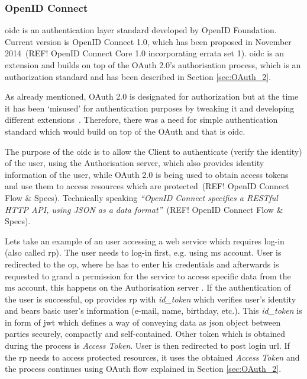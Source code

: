 \subsubsection{OpenID Connect}

\acrfull{oidc} is an authentication layer standard developed by OpenID Foundation. Current version is OpenID Connect 1.0, which has been proposed in November 2014~\cite{}(REF! OpenID Connect Core 1.0 incorporating errata set 1). \acrshort{oidc} is an extension and builds on top of the OAuth 2.0’s authorisation process, which is an authorization standard and has been described in Section \ref{sec:OAuth_2}. 

As already mentioned, OAuth 2.0 is designated for authorization but at the time it has been ‘misused’ for authentication purposes by tweaking it and developing different extensions~\cite{User Authentication with OAuth 2.0}. Therefore, there was a need for simple authentication standard which would build on top of the OAuth and that is \acrshort{oidc}.

The purpose of the \acrshort{oidc} is to allow the Client to authenticate (verify the identity) of the user, using the Authorisation server, which also provides identity information of the user, while OAuth 2.0 is being used to obtain access tokens and use them to access resources which are protected~\cite{}(REF! OpenID Connect Flow \& Specs). Technically speaking \textit{“OpenID Connect specifies a RESTful HTTP API, using JSON as a data format”}~\cite{}(REF! OpenID Connect Flow \& Specs).

Lets take an example of an user accessing a web service which requires log-in (also called \acrfull{rp}). The user needs to log-in first, e.g. using \acrfull{ms} account. User is redirected to the \acrfull{op}, where he has to enter his credentials and afterwards is requested to grand a permission for the service to access specific data from the \acrshort{ms} account, this happens on the Authorisation server
. If the authentication of the user is successful, \acrshort{op} provides \acrfull{rp} with \textit{id\_token} which verifies user’s identity and bears basic user’s information (e-mail, name, birthday, etc.). This \textit{id\_token} is in form of \acrfull{jwt} which defines a way of conveying data as \acrshort{json} object between parties securely, compactly and self-contained. Other token which is obtained during the process is \textit{Access Token}. User is then redirected to post login \acrshort{url}. If the  \acrshort{rp} needs to access protected resources, it uses the obtained \textit{Access Token} and the process continues using OAuth flow explained in Section \ref{sec:OAuth_2}.